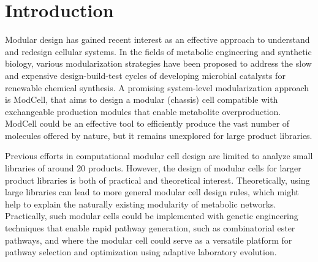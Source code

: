 \section{Introduction}
Modular design has gained recent interest as an effective approach to understand and redesign cellular systems.\citep{garcia2019b}
In the fields of metabolic engineering and synthetic biology, various modularization strategies\citep{biggs2014,trinh2015,garcia2019,garcia2019c,garcia2019d} have been proposed to address the slow and expensive design-build-test cycles of developing microbial catalysts for renewable chemical synthesis.\citep{nielsen2016}
A promising system-level modularization\citep{purnick2009} approach is ModCell,\citep{garcia2019} that aims to design a modular (chassis) cell compatible with exchangeable production modules that enable metabolite overproduction.
ModCell could be an effective tool to efficiently produce the vast number of molecules offered by nature,\citep{trinh2016, lee2019}
but it remains unexplored for large product libraries.


Previous efforts in computational modular cell design are limited to analyze small libraries of around 20 products.\citep{garcia2019,garcia2019d}
However, the design of modular cells for larger product libraries is both of practical and theoretical interest.
Theoretically, using large libraries can lead to more general modular cell design rules, which might help to explain the naturally existing modularity of metabolic networks.\citep{garcia2019b}
Practically, such modular cells could be implemented with genetic engineering techniques that enable rapid pathway generation, such as combinatorial ester pathways,\citep{layton2014} and where the modular cell could serve as a versatile platform for pathway selection and optimization using adaptive laboratory evolution.\citep{wilbanks2017}


